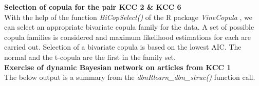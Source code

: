 \textbf{Selection of copula for the pair \ac{KCC} 2 \& \ac{KCC} 6} \\ 
With the help of the function \textit{BiCopSelect()} of the R package \textit{VineCopula} \citep{nagler2019vinecopula}, we can select an appropriate bivariate copula family for the data. A set of possible copula families is considered and maximum likelihood estimations for each are carried out. Selection of a bivariate copula is based on the lowest \ac{AIC}. The normal and the t-copula are the first in the family set.
\\




\textbf{Exercise of dynamic Bayesian network on articles from KCC 1} \\ 
The below output is a summary from the \textit{dbnR\:\:learn\_dbn\_struc()} function call.
\\





